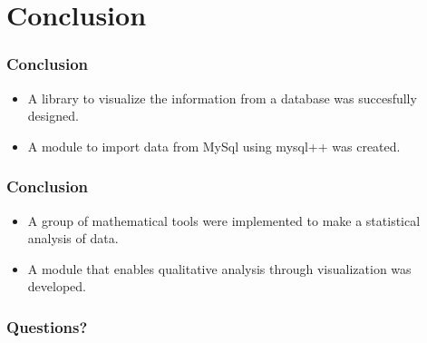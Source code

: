 \documentclass{beamer}
\begin{document}
\section{Conclusion}
\begin{frame}
\frametitle{Conclusion}
\begin{itemize}
\item A library to visualize the information from a database was succesfully designed.
\item A module to import data from MySql using mysql++ was created.
\end{itemize}
\end{frame}

\begin{frame}
\frametitle{Conclusion}
\begin{itemize}
\item A group of mathematical tools were implemented to make a statistical analysis of data.
\item A module that enables qualitative analysis through visualization was developed. 
\end{itemize}
\end{frame}

\begin{frame}
\frametitle{Questions?}
\end{frame}
\end{document}
